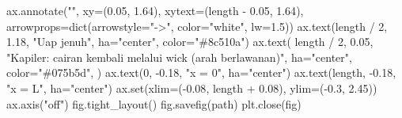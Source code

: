 \documentclass[
  12pt,
  12pt,a4paper,oneside]{report}
\newenvironment{Shaded}{}{}
\newcommand{\BuiltInTok}[1]{\textcolor[rgb]{0.00,0.50,0.00}{#1}}
\newcommand{\DecValTok}[1]{\textcolor[rgb]{0.25,0.63,0.44}{#1}}
\newcommand{\FloatTok}[1]{\textcolor[rgb]{0.25,0.63,0.44}{#1}}
\newcommand{\NormalTok}[1]{#1}
\newcommand{\OperatorTok}[1]{\textcolor[rgb]{0.40,0.40,0.40}{#1}}
\newcommand{\StringTok}[1]{\textcolor[rgb]{0.25,0.44,0.63}{#1}}
\begin{document}
\begin{Shaded}
\begin{Highlighting}[]
\NormalTok{    ax.annotate(}\StringTok{""}\NormalTok{, xy}\OperatorTok{=}\NormalTok{(}\FloatTok{0.05}\NormalTok{, }\FloatTok{1.64}\NormalTok{), xytext}\OperatorTok{=}\NormalTok{(length }\OperatorTok{{-}} \FloatTok{0.05}\NormalTok{, }\FloatTok{1.64}\NormalTok{),}
\NormalTok{                arrowprops}\OperatorTok{=}\BuiltInTok{dict}\NormalTok{(arrowstyle}\OperatorTok{=}\StringTok{"{-}\textgreater{}"}\NormalTok{, color}\OperatorTok{=}\StringTok{"white"}\NormalTok{, lw}\OperatorTok{=}\FloatTok{1.5}\NormalTok{))}
\NormalTok{    ax.text(length }\OperatorTok{/} \DecValTok{2}\NormalTok{, }\FloatTok{1.18}\NormalTok{, }\StringTok{"Uap jenuh"}\NormalTok{, ha}\OperatorTok{=}\StringTok{"center"}\NormalTok{, color}\OperatorTok{=}\StringTok{"\#8c510a"}\NormalTok{)}
\NormalTok{    ax.text(}
\NormalTok{        length }\OperatorTok{/} \DecValTok{2}\NormalTok{, }\FloatTok{0.05}\NormalTok{,}
        \StringTok{"Kapiler: cairan kembali melalui wick (arah berlawanan)"}\NormalTok{,}
\NormalTok{        ha}\OperatorTok{=}\StringTok{"center"}\NormalTok{, color}\OperatorTok{=}\StringTok{"\#075b5d"}\NormalTok{,}
\NormalTok{    )}
\NormalTok{    ax.text(}\DecValTok{0}\NormalTok{, }\OperatorTok{{-}}\FloatTok{0.18}\NormalTok{, }\StringTok{"x = 0"}\NormalTok{, ha}\OperatorTok{=}\StringTok{"center"}\NormalTok{)}
\NormalTok{    ax.text(length, }\OperatorTok{{-}}\FloatTok{0.18}\NormalTok{, }\StringTok{"x = L"}\NormalTok{, ha}\OperatorTok{=}\StringTok{"center"}\NormalTok{)}
\NormalTok{    ax.}\BuiltInTok{set}\NormalTok{(xlim}\OperatorTok{=}\NormalTok{(}\OperatorTok{{-}}\FloatTok{0.08}\NormalTok{, length }\OperatorTok{+} \FloatTok{0.08}\NormalTok{), ylim}\OperatorTok{=}\NormalTok{(}\OperatorTok{{-}}\FloatTok{0.3}\NormalTok{, }\FloatTok{2.45}\NormalTok{))}
\NormalTok{    ax.axis(}\StringTok{"off"}\NormalTok{)}
\NormalTok{    fig.tight\_layout()}
\NormalTok{    fig.savefig(path)}
\NormalTok{    plt.close(fig)}



\end{Highlighting}
\end{Shaded}
\end{document}
